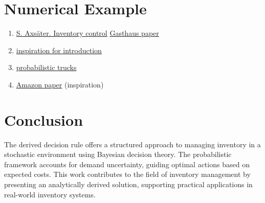 \documentclass[a4paper,12pt]{article}
\theoremstyle{definition}
\begin{document}
	\section{Numerical Example}
	\begin{enumerate}
		\item \href{https://www.academia.edu/27965536/Inventorycontroltextbook_140429044831_phpapp02_1_}{S. Axsäter. Inventory control}
		\href{https://proceedings.mlr.press/v151/kan22a/kan22a.pdf}{Gasthaus paper}
		\item \href{https://arxiv.org/pdf/2012.02392}{inspiration for introduction}
		\item \href{https://arxiv.org/pdf/2310.17168}{probabilistic trucks}
		\item \href{https://arxiv.org/pdf/2310.16096}{Amazon paper} (inspiration)
	\end{enumerate}
	
	
	\section{Conclusion}
	The derived decision rule offers a structured approach to managing inventory in a stochastic environment using Bayesian decision theory. The probabilistic framework accounts for demand uncertainty, guiding optimal actions based on expected costs. This work contributes to the field of inventory management by presenting an analytically derived solution, supporting practical applications in real-world inventory systems.
	
	\newpage
	\begin{appendices}
		
	\end{appendices}
	
	
	
	
	
	
\end{document}
